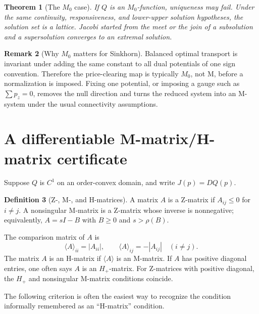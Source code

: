 \documentclass[11pt]{article}
\theoremstyle{definition}
\newtheorem{definition}{Definition}[section]
\newtheorem{remark}[definition]{Remark}
\theoremstyle{plain}
\newtheorem{theorem}[definition]{Theorem}
\begin{document}
\begin{theorem}[The $M_0$ case]
If $Q$ is an $M_0$-function, uniqueness may fail. Under the same continuity, responsiveness, and lower-upper solution hypotheses, the solution set is a lattice. Jacobi started from the meet or the join of a subsolution and a supersolution converges to an extremal solution.
\end{theorem}

\begin{remark}[Why $M_0$ matters for Sinkhorn]
Balanced optimal transport is invariant under adding the same constant to all dual potentials of one sign convention. Therefore the price-clearing map is typically $M_0$, not M, before a normalization is imposed. Fixing one potential, or imposing a gauge such as $\sum p_z=0$, removes the null direction and turns the reduced system into an M-system under the usual connectivity assumptions.
\end{remark}

\section{A differentiable M-matrix/H-matrix certificate}

Suppose $Q$ is $C^1$ on an order-convex domain, and write $J(p)=DQ(p)$.

\begin{definition}[Z-, M-, and H-matrices]
A matrix $A$ is a Z-matrix if $A_{ij}\leq0$ for $i\neq j$. A nonsingular M-matrix is a Z-matrix whose inverse is nonnegative; equivalently, $A=sI-B$ with $B\geq0$ and $s>\rho(B)$.

The comparison matrix of $A$ is
\[
        \langle A\rangle_{ii}=|A_{ii}|,
        \qquad
        \langle A\rangle_{ij}=-|A_{ij}|\quad(i\neq j).
\]
The matrix $A$ is an H-matrix if $\langle A\rangle$ is an M-matrix. If $A$ has positive diagonal entries, one often says $A$ is an $H_+$-matrix. For Z-matrices with positive diagonal, the $H_+$ and nonsingular M-matrix conditions coincide.
\end{definition}

The following criterion is often the easiest way to recognize the condition informally remembered as an ``H-matrix'' condition.
\end{document}
